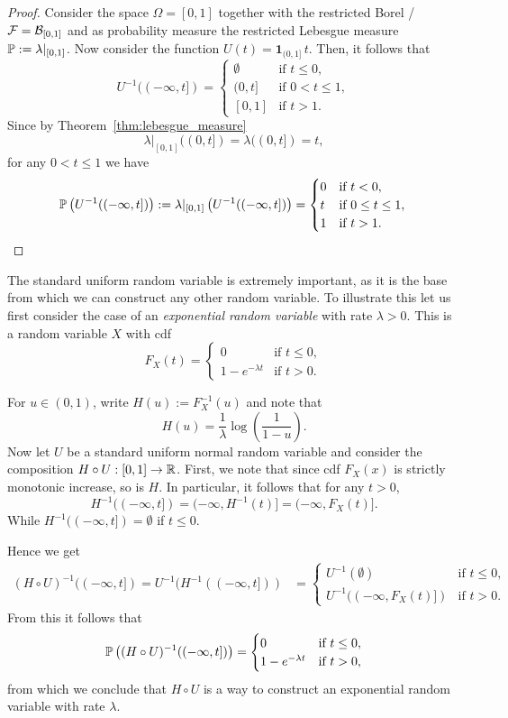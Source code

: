 \begin{proof}
Consider the space $\Omega = [0,1]$ together with the restricted Borel \sigalg/ $\mathcal F = \mathcal B_{[0,1]}$ and as probability measure the restricted Lebesgue measure $\mathbb P := \lambda|_{[0,1]}$. Now consider the function $U(t) = \mathbf{1}_{(0,1]} \, t$. Then, it follows that
\[
	U^{-1}((-\infty,t]) = \begin{cases}
		\emptyset &\text{if } t \le 0,\\
		(0,t] &\text{if } 0 < t \le 1, \\
		[0,1] &\text{if } t > 1.
	\end{cases}
\]
Since by Theorem~\ref{thm:lebesgue_measure}
\[
	\lambda|_{[0,1]}((0,t]) = \lambda((0,t]) = t,
\]
for any $0 < t \le 1$ we have
\[
	\mathbb P\left(U^{-1}((-\infty,t])\right) := \lambda|_{[0,1]}\left(U^{-1}((-\infty,t])\right)
	= \begin{cases}
		0 &\text{if } t < 0,\\
		t &\text{if } 0 \le t\le 1,\\
		1 &\text{if } t > 1.
	\end{cases}\qedhere
\]
\end{proof}

The standard uniform random variable is extremely important, as it is the base from which we can construct any other random variable. To illustrate this let us first consider the case of an \emph{exponential random variable} with rate $\lambda > 0$. This is a random variable $X$ with cdf
\[
	F_X(t) = \begin{cases}
		0 &\text{if } t \le 0,\\
		1-e^{-\lambda t} &\text{if } t > 0.
	\end{cases}
\]

For $u \in (0,1)$, write $H(u) := F_X^{-1}(u)$ and note that
\[
	H(u) = \frac{1}{\lambda} \log\left(\frac{1}{1-u}\right).
\]
Now let $U$ be a standard uniform normal random variable and consider the composition $H \circ U : [0,1] \to \mathbb R$. First, we note that since cdf $F_X(x)$ is strictly monotonic increase, so is $H$. In particular, it follows that for any $t > 0$,
\[
	H^{-1}((-\infty,t]) = (-\infty, H^{-1}(t)] = (-\infty, F_X(t)].
\]
While $H^{-1}((-\infty,t]) = \emptyset$ if $t \le 0$.

Hence we get
\begin{align*}
	(H \circ U)^{-1}((-\infty, t]) = U^{-1}(H^{-1}((-\infty, t]))
	&= \begin{cases}
		U^{-1}(\emptyset) &\text{if } t \le 0,\\
		U^{-1}((-\infty, F_X(t)]) &\text{if } t > 0.
	\end{cases}
\end{align*}
From this it follows that 
\[
	\mathbb P\left((H \circ U)^{-1}((-\infty, t])\right) = \begin{cases}
			0 &\text{if } t \le 0,\\
			1-e^{-\lambda t} &\text{if } t > 0,
		\end{cases}
\]
from which we conclude that $H \circ U$ is a way to construct an exponential random variable with rate $\lambda$.

